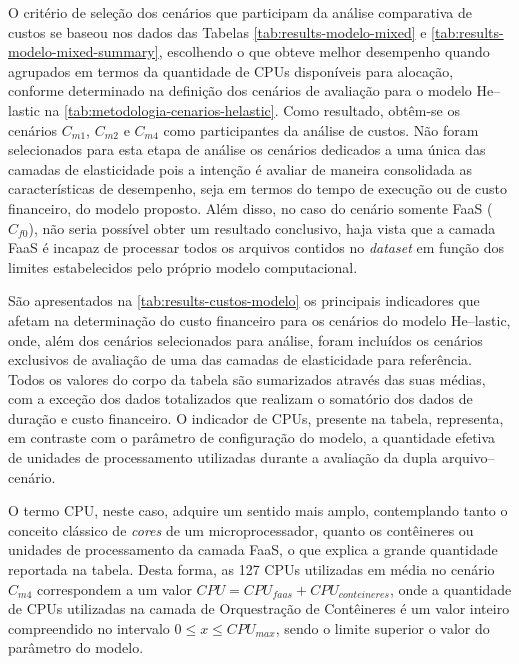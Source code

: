 \documentclass[english,brazilian]{UNISINOSmonografia} %
\begin{document}
O critério de seleção dos cenários que participam da análise comparativa de custos se baseou nos dados das Tabelas \ref{tab:results-modelo-mixed} e \ref{tab:results-modelo-mixed-summary}, escolhendo o que obteve melhor desempenho quando agrupados em termos da quantidade de CPUs disponíveis para alocação, conforme determinado na definição dos cenários de avaliação para o modelo \textsf{He}--lastic na \autoref{tab:metodologia-cenarios-helastic}.
%
Como resultado, obtêm-se os cenários $C_{m1}$, $C_{m2}$ e $C_{m4}$ como participantes da análise de custos.
%
Não foram selecionados para esta etapa de análise os cenários dedicados a uma única das camadas de elasticidade pois a intenção é avaliar de maneira consolidada as características de desempenho, seja em termos do tempo de execução ou de custo financeiro, do modelo proposto.
%
Além disso, no caso do cenário somente FaaS ($C_{f0}$), não seria possível obter um resultado conclusivo, haja vista que a camada FaaS é incapaz de processar todos os arquivos contidos no \textit{dataset} em função dos limites estabelecidos pelo próprio modelo computacional.



São apresentados na \autoref{tab:results-custos-modelo} os principais indicadores que afetam na determinação do custo financeiro para os cenários do modelo \textsf{He}--lastic, onde, além dos cenários selecionados para análise, foram incluídos os cenários exclusivos de avaliação de uma das camadas de elasticidade para referência.
%
Todos os valores do corpo da tabela são sumarizados através das suas médias, com a exceção dos dados totalizados que realizam o somatório dos dados de duração e custo financeiro.
%
O indicador de CPUs, presente na tabela, representa, em contraste com o parâmetro de configuração do modelo, a quantidade efetiva de unidades de processamento utilizadas durante a avaliação da dupla arquivo--cenário.



O termo CPU, neste caso, adquire um sentido mais amplo, contemplando tanto o conceito clássico de \textit{cores} de um microprocessador, quanto os contêineres ou unidades de processamento da camada FaaS, o que explica a grande quantidade reportada na tabela.
%
Desta forma, as 127 CPUs utilizadas em média no cenário $C_{m4}$ correspondem a um valor $ CPU = CPU_{faas} + CPU_{conteineres} $, onde a quantidade de CPUs utilizadas na camada de Orquestração de Contêineres é um valor inteiro compreendido no intervalo $ 0 \le x \le CPU_{max} $, sendo o limite superior o valor do parâmetro do modelo.
\end{document}
